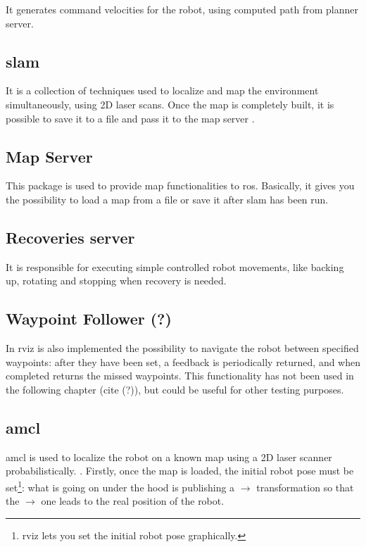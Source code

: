 It generates command velocities for the robot, using computed path from planner server.

\subsection*{\Acrfull{slam}}

It is a collection of techniques used to localize and map the environment simultaneously, using 2D laser scans. Once the map is completely built, it is possible to save it to a file and pass it to the map server \cite{slam}.

\subsection*{Map Server}

This package is used to provide map functionalities to \Acrshort{ros}. Basically, it gives you the possibility to load a map from a file or save it after \Acrshort{slam} has been run.

\subsection*{Recoveries server}

It is responsible for executing simple controlled robot movements, like backing up, rotating and stopping when recovery is needed.

\subsection*{Waypoint Follower (?)} 

In \Acrshort{rviz} is also implemented the possibility to navigate the robot between specified waypoints: after they have been set, a feedback is periodically returned, and when completed returns the missed waypoints. This functionality has not been used in the following chapter (cite (?)), but could be useful for other testing purposes.

\subsection*{\Acrfull{amcl}}

\Acrshort{amcl} is used to localize the robot on a known map using a 2D laser scanner probabilistically.
. Firstly, once the map is loaded, the initial robot pose must be set\footnote{\Acrshort{rviz} lets you set the initial robot pose graphically.}: what is going on under the hood is publishing a  $\rightarrow$  transformation so that the  $\rightarrow$  one leads to the real position of the robot.

